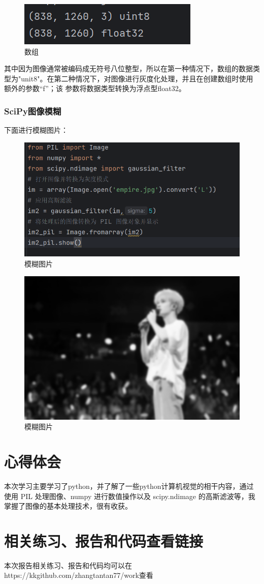 \documentclass{ctexart}
\begin{document}
	\begin{figure}[H]
		\centering
		\includegraphics[scale=0.50]{3.96}
		\caption{数组}
	\end{figure}
	
	其中因为图像通常被编码成无符号八位整型，所以在第一种情况下，数组的数据类型为"unit8"。在第二种情况下，对图像进行灰度化处理，并且在创建数组时使用额外的参数“f”；该
	参数将数据类型转换为浮点型float32。
	\subsubsection{SciPy图像模糊}
	下面进行模糊图片：
	
	\begin{figure}[H]
		\centering
		\includegraphics[scale=0.50]{3.98}
		\caption{模糊图片}
	\end{figure}
	\begin{figure}[H]
		\centering
		\includegraphics[scale=0.10]{3.99}
		\caption{模糊图片}
	\end{figure}
	
	
	\section{心得体会}
	本次学习主要学习了python，并了解了一些python计算机视觉的相干内容，通过使用 PIL 处理图像、numpy 进行数值操作以及 scipy.ndimage 的高斯滤波等，我掌握了图像的基本处理技术，很有收获。
	\section{相关练习、报告和代码查看链接}
	本次报告相关练习、报告和代码均可以在https://kkgithub.com/zhangtantan77/work查看
\end{document}
